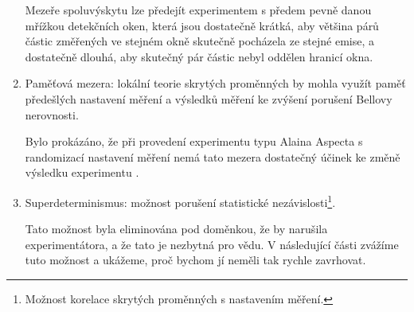 \begin{enumerate}
        Mezeře spoluvýskytu lze předejít experimentem s předem pevně danou mřížkou detekčních oken, která jsou dostatečně krátká, aby většina párů částic změřených ve stejném okně skutečně pocházela ze stejné emise, a dostatečně dlouhá, aby skutečný pár částic nebyl oddělen hranicí okna.

        \item Paměťová mezera: lokální teorie skrytých proměnných by mohla využít paměť předešlých nastavení měření a výsledků měření ke zvýšení porušení Bellovy nerovnosti.
        
        Bylo prokázáno, že při provedení experimentu typu Alaina Aspecta \parencite*{belltest:2} s randomizací nastavení měření nemá tato mezera dostatečný účinek ke změně výsledku experimentu \parencite{measloop:1}\parencite{measloop:2}\parencite{measloop:3}.

        \item Superdeterminismus: možnost porušení statistické nezávislosti\footnote[4]{Možnost korelace skrytých proměnných s nastavením měření.}.
        
        Tato možnost byla eliminována pod doměnkou, že by narušila  experimentátora, a že tato  je nezbytná pro vědu. V následující části zvážíme tuto možnost a ukážeme, proč bychom jí neměli tak rychle zavrhovat.
\end{enumerate}